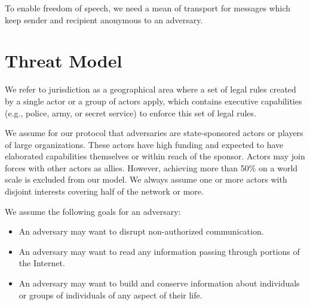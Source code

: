 To enable freedom of speech, we need a mean of transport for messages which keep sender and recipient anonymous to an adversary.

\section{Threat Model\label{sec:adversary}}
We refer to jurisdiction as a geographical area where a set of legal rules created by a single actor or a group of actors apply, which contains executive capabilities (e.g., police, army, or secret service) to enforce this set of legal rules.

We assume for our protocol that adversaries are state-sponsored actors or players of large organizations. These actors have high funding and expected to have elaborated capabilities themselves or within reach of the sponsor. Actors may join forces with other actors as allies. However, achieving more than 50\% on a world scale is excluded from our model. We always assume one or more actors with disjoint interests covering half of the network or more. 

We assume the following goals for an adversary:
\begin{itemize}
	\item An adversary may want to disrupt non-authorized communication.
	\item An adversary may want to read any information passing through portions of the Internet.
	\item An adversary may want to build and conserve information about individuals or groups of individuals of any aspect of their life. 
\end{itemize}

